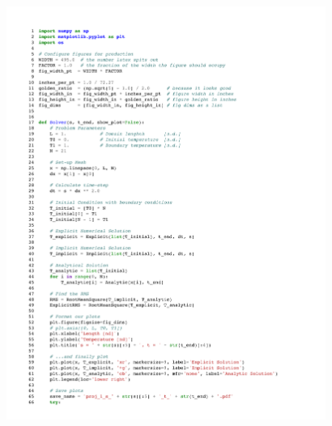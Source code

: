 \documentclass[twocolumn,10pt]{asme2ej}
\begin{document}
\begin{figure}[htb]
\begin{center}
\includegraphics[page=4,width=0.93\textwidth]{../Karasinski - Case Study 1.pdf}
\end{center}
\end{figure}
\end{document}
